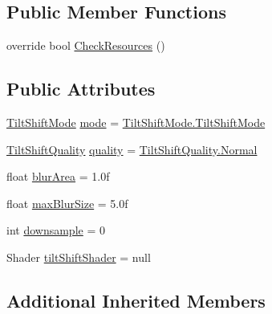 \subsection*{Public Member Functions}
\begin{DoxyCompactItemize}
\item 
override bool \mbox{\hyperlink{class_unity_standard_assets_1_1_image_effects_1_1_tilt_shift_a6104d3359c6ded06aa89fba59ecf404e}{Check\+Resources}} ()
\end{DoxyCompactItemize}
\subsection*{Public Attributes}
\begin{DoxyCompactItemize}
\item 
\mbox{\hyperlink{class_unity_standard_assets_1_1_image_effects_1_1_tilt_shift_a30526c23a7fabb0f3b6e86e669fbeaae}{Tilt\+Shift\+Mode}} \mbox{\hyperlink{class_unity_standard_assets_1_1_image_effects_1_1_tilt_shift_a7448aeb0fe5c22eab4b9bb25f338ac18}{mode}} = \mbox{\hyperlink{class_unity_standard_assets_1_1_image_effects_1_1_tilt_shift_a30526c23a7fabb0f3b6e86e669fbeaaea6d0e5d7c0b9dd0bd373b188a1dee4a4e}{Tilt\+Shift\+Mode.\+Tilt\+Shift\+Mode}}
\item 
\mbox{\hyperlink{class_unity_standard_assets_1_1_image_effects_1_1_tilt_shift_a25a7f26cb8470a26a167c6d381489605}{Tilt\+Shift\+Quality}} \mbox{\hyperlink{class_unity_standard_assets_1_1_image_effects_1_1_tilt_shift_a3336504f4de0dbb94802f0d78eb27bbc}{quality}} = \mbox{\hyperlink{class_unity_standard_assets_1_1_image_effects_1_1_tilt_shift_a25a7f26cb8470a26a167c6d381489605a960b44c579bc2f6818d2daaf9e4c16f0}{Tilt\+Shift\+Quality.\+Normal}}
\item 
float \mbox{\hyperlink{class_unity_standard_assets_1_1_image_effects_1_1_tilt_shift_aeaf9de7829b263b96b1469b85d975fcc}{blur\+Area}} = 1.\+0f
\item 
float \mbox{\hyperlink{class_unity_standard_assets_1_1_image_effects_1_1_tilt_shift_a4f5be3f7fffdb90e6b0be07a7ab30308}{max\+Blur\+Size}} = 5.\+0f
\item 
int \mbox{\hyperlink{class_unity_standard_assets_1_1_image_effects_1_1_tilt_shift_a9efad9acdbd012870ef6d8fc8ee424da}{downsample}} = 0
\item 
Shader \mbox{\hyperlink{class_unity_standard_assets_1_1_image_effects_1_1_tilt_shift_ab5f08d9ebd9012a4e26bbf6e711a0cf7}{tilt\+Shift\+Shader}} = null
\end{DoxyCompactItemize}
\subsection*{Additional Inherited Members}


